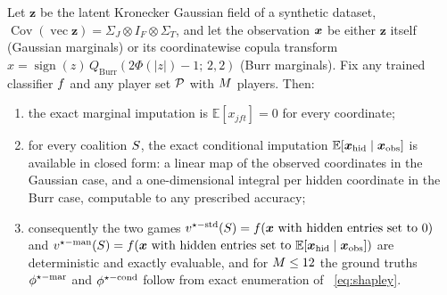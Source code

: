 \begin{proposition}
\label{prop:oracle}
Let $\bm{z}$ be the latent Kronecker Gaussian field of a synthetic dataset,
$\operatorname{Cov}(\operatorname{vec}\bm{z}) = \Sigma_J \otimes I_F \otimes
\Sigma_T$, and let the observation $\bm{x}$ be either $\bm{z}$ itself (Gaussian
marginals) or its coordinatewise copula transform
$x = \operatorname{sign}(z)\,Q_{\mathrm{Burr}}(2\Phi(|z|){-}1;\,2,2)$ (Burr
marginals).  Fix any trained classifier $f$ and any player set $\mathcal{P}$
with $M$ players.  Then:
\begin{enumerate}[label=(\roman*)]
\item the exact marginal imputation is $\mathbb{E}[x_{jft}] = 0$ for every
  coordinate;
\item for every coalition $S$, the exact conditional imputation
  $\mathbb{E}[\bm{x}_{\mathrm{hid}} \mid \bm{x}_{\mathrm{obs}}]$ is available in
  closed form: a linear map of the observed coordinates in the Gaussian case,
  and a one-dimensional integral per hidden coordinate in the Burr case,
  computable to any prescribed accuracy;
\item consequently the two games
  $v^{\star\mathrm{-std}}(S) = f(\bm{x} \text{ with hidden entries set
  to } 0)$ and
  $v^{\star\mathrm{-man}}(S) = f(\bm{x} \text{ with hidden entries set
  to } \mathbb{E}[\bm{x}_{\mathrm{hid}} \mid \bm{x}_{\mathrm{obs}}])$ are
  deterministic and exactly evaluable, and for $M \leq 12$ the ground
  truths $\phi^{\star\mathrm{-mar}}$ and $\phi^{\star\mathrm{-cond}}$ follow from exact enumeration of
  ~\eqref{eq:shapley}.
\end{enumerate}
\end{proposition}

